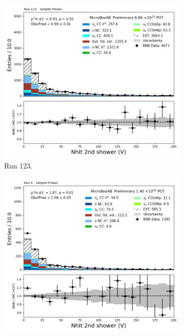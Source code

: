\begin{figure}[H]
    \centering
    \begin{subfigure}[t]{0.32\linewidth}
        \includegraphics[width=\linewidth]{technote/Appendix_Preselection/Figures/1e0p0pi/Run123/secondshower_V_nhit_Run123_1e0p0pi_Presel.png}
        \caption{Run 123.}
    \end{subfigure}%
    \hspace{0.2cm}%
    \begin{subfigure}[t]{0.32\linewidth}
        \includegraphics[width=\linewidth]{technote/Appendix_Preselection/Figures/1e0p0pi/Run4b/secondshower_V_nhit_Run4b_1e0p0pi_Presel.png}

\end{subfigure}
\end{figure}
